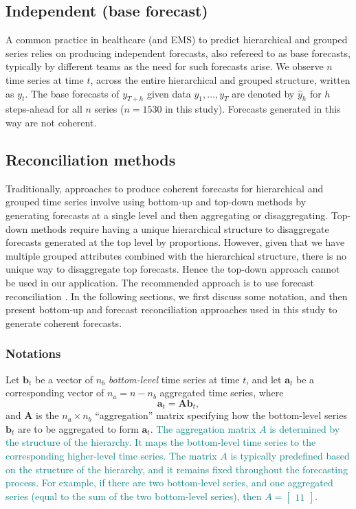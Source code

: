 \documentclass[
  authoryear,
  preprint,
  3p]{elsarticle}
\begin{document}
\hypertarget{independent-base-forecast}{%
\subsection{Independent (base
forecast)}\label{independent-base-forecast}}

A common practice in healthcare (and EMS) to predict hierarchical and
grouped series relies on producing independent forecasts, also refereed
to as base forecasts, typically by different teams as the need for such
forecasts arise. We observe \(n\) time series at time \(t\), across the
entire hierarchical and grouped structure, written as \(y_t\). The base
forecasts of \(y_{T+h}\) given data \(y_1,\dots,y_T\) are denoted by
\(\hat{y}_h\) for \(h\) steps-ahead for all \(n\) series (\(n=1530\) in
this study). Forecasts generated in this way are not coherent.

\hypertarget{reconciliation-methods}{%
\subsection{Reconciliation methods}\label{reconciliation-methods}}

Traditionally, approaches to produce coherent forecasts for hierarchical
and grouped time series involve using bottom-up and top-down methods by
generating forecasts at a single level and then aggregating or
disaggregating. Top-down methods require having a unique hierarchical
structure to disaggregate forecasts generated at the top level by
proportions. However, given that we have multiple grouped attributes
combined with the hierarchical structure, there is no unique way to
disaggregate top forecasts. Hence the top-down approach cannot be used
in our application. The recommended approach is to use forecast
reconciliation \citep{hyndman2011optimal}. In the following sections, we
first discuss some notation, and then present bottom-up and forecast
reconciliation approaches used in this study to generate coherent
forecasts.

\hypertarget{notations}{%
\subsubsection{Notations}\label{notations}}

Let \(\bm{b}_t\) be a vector of \(n_b\) \emph{bottom-level} time series
at time \(t\), and let \(\bm{a}_t\) be a corresponding vector of
\(n_a = n-n_b\) aggregated time series, where \[
  \bm{a}_t = \bm{A}\bm{b}_t,
\] and \(\bm{A}\) is the \(n_a\times n_b\) ``aggregation'' matrix
specifying how the bottom-level series \(\bm{b}_t\) are to be aggregated
to form \(\bm{a}_t\).
\textcolor{teal}{The aggregation matrix $A$ is determined by the structure of the hierarchy. It maps the bottom-level time series to the corresponding higher-level time series. The matrix $A$ is typically predefined based on the structure of the hierarchy, and it remains fixed throughout the forecasting process. For example, if there are two bottom-level series, and one aggregated series (equal to the sum of the two bottom-level series), then $A = \begin{bmatrix} 1 1 \end{bmatrix}$.
}
\end{document}
